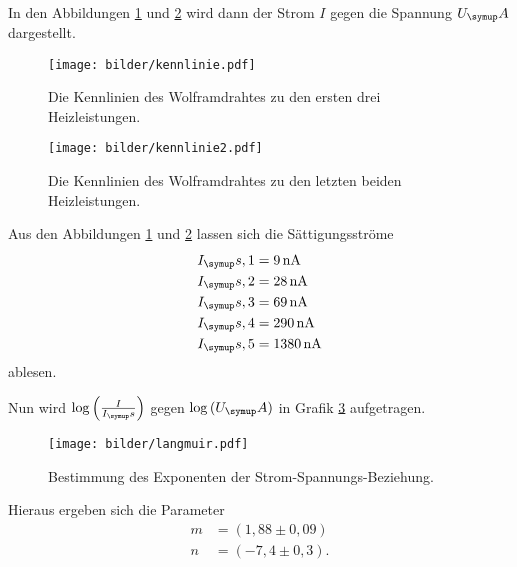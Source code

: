 In den Abbildungen \ref{fig:kenn} und \ref{fig:kenn1} wird dann der Strom $I$ gegen die Spannung $U_\su{A}$
dargestellt.
\begin{figure}[H]
  \centering
  \texttt{[image: bilder/kennlinie.pdf]}
  \caption{Die Kennlinien des Wolframdrahtes zu den ersten drei Heizleistungen.}
  \label{fig:kenn}
\end{figure}
\begin{figure}[H]
  \centering
  \texttt{[image: bilder/kennlinie2.pdf]}
  \caption{Die Kennlinien des Wolframdrahtes zu den letzten beiden Heizleistungen.}
  \label{fig:kenn1}
\end{figure}
Aus den Abbildungen \ref{fig:kenn} und \ref{fig:kenn1} lassen sich die Sättigungsströme
\begin{align*}
  I_\su{s,1} &= \SI{9}{\nano\ampere}  \\
  I_\su{s,2} &= \SI{28}{\nano\ampere} \\
  I_\su{s,3} &= \SI{69}{\nano\ampere}  \\
  I_\su{s,4} &= \SI{290}{\nano\ampere}  \\
  I_\su{s,5} &= \SI{1380}{\nano\ampere}  \\
\end{align*}
ablesen.

Nun wird $\log{\left(\frac{I}{I_\su{s}}\right)}$ gegen $\log{(U_\su{A})}$ in Grafik \ref{fig:langmuir}
aufgetragen.
\begin{figure}[H]
  \centering
  \texttt{[image: bilder/langmuir.pdf]}
  \caption{Bestimmung des Exponenten der Strom-Spannungs-Beziehung.}
  \label{fig:langmuir}
\end{figure}
Hieraus ergeben sich die Parameter
\begin{align*}
  m &= (1,88\pm0,09) \\
  n &= (-7,4\pm0,3). \\
\end{align*}

